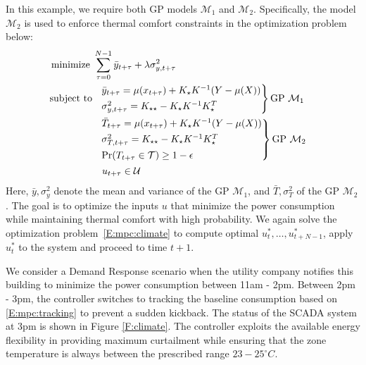 In this example, we require both GP models \(\mathcal{M}_1\) and \(\mathcal{M}_2\).
Specifically, the model \(\mathcal{M}_2\) is used to enforce thermal comfort constraints in the optimization problem below:
\begin{align}
&\operatorname*{minimize} \ \sum_{\tau=0}^{N-1} \bar{y}_{t+\tau} + \lambda \sigma^2_{y,t+\tau} \label{E:mpc:climate} \\
& 
\begin{aligned}
\text{subject to}\ \  & \begin{rcases}\bar{y}_{t+\tau} = \mu(x_{t+\tau}) + K_\star K^{-1} (Y - \mu(X)) \nonumber\\
\sigma^2_{y,t+\tau} = K_{\star \star} - K_\star K^{-1} K_\star^T
\end{rcases} \text{GP } \mathcal{M}_1 \\
& \begin{rcases}
 \bar{T}_{t+\tau} = \mu(x_{t+\tau}) + K_\star K^{-1} (Y - \mu(X)) \nonumber\\
\sigma^2_{T,t+\tau} = K_{\star \star} - K_\star K^{-1} K_\star^T \\
\Pr(T_{t+\tau} \in \mathcal{T}) \geq 1 - \epsilon \nonumber
\end{rcases} \text{GP } \mathcal{M}_2 \\
& \ u_{t+\tau} \in \mathcal{U} \nonumber
\end{aligned}
\end{align}
Here, \(\bar{y},\sigma^2_{y}\) denote the mean and variance of the GP \(\mathcal{M}_1\), and \(\bar{T},\sigma^2_{T}\) of the GP \(\mathcal{M}_2\). 
The goal is to optimize the inputs \(u\) that minimize the power consumption while maintaining thermal comfort with high probability. 
We again solve the optimization problem~\eqref{E:mpc:climate} to compute optimal \(u_{t}^*, \dots, u_{t+N-1}^*\), apply \(u_{t}^*\) to the system and proceed to time \(t+1\).

We consider a Demand Response scenario when the utility company notifies this building to minimize the power consumption between 11am - 2pm.
Between 2pm - 3pm, the controller switches to tracking the baseline consumption based on \eqref{E:mpc:tracking} to prevent a sudden kickback.
The status of the SCADA system at 3pm is shown in Figure \ref{F:climate}.
The controller exploits the available energy flexibility in providing maximum curtailment while ensuring that the zone temperature is always between the prescribed range \(23-25^\circ C\).



